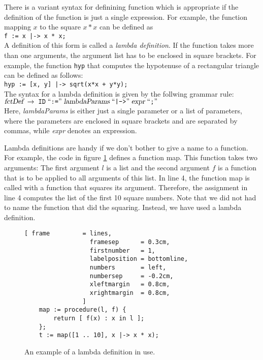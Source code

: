 There is a variant syntax for definining function which is appropriate if the definition of the
function is just a single expression.  For example, the function mapping $x$ to the square
$x*x$ can be defined as
\\[0.2cm]
\hspace*{1.3cm}
\texttt{f := x |-> x * x;}
\\[0.2cm]
A definition of this form is called a \emph{lambda definition}.
If the function takes more than one arguments, the argument list has to be enclosed in square
brackets.  For example, the function \texttt{hyp} that computes the hypotenuse of a rectangular triangle
can be defined as follows:
\\[0.2cm]
\hspace*{1.3cm}
\texttt{hyp := [x, y] |-> sqrt(x*x + y*y);}
\\[0.2cm]
The syntax for a lambda definition is given by the follwing grammar rule:
\\[0.2cm]
\hspace*{1.3cm}
$\textsl{fctDef} \;\rightarrow\; \mathtt{ID} \;\mbox{``\texttt{:=}''}\; \textsl{lambdaParams} \;\mbox{``\texttt{|->}''}\; \textsl{expr} \;\mbox{``\texttt{;}''}\;$
\\[0.2cm]
Here, \textsl{lambdaParams} is either just a single parameter or a list of parameters, where the
parameters are enclosed in square brackets and are separated by commas, while
\textsl{expr} denotes an expression.

Lambda definitions are handy if we don't bother to give a name to a function.
For example, the code in figure \ref{fig:lambda.stlx} defines a function map.  This function takes
two arguments: The first argument $l$ is a list and the second argument $f$ is a function that is to
be applied to all arguments of this list.  In line 4, the function map is called with a function
that squares its argument.  Therefore, the assignment in line 4 computes the list of the first 10
square numbers.  Note that we did not had to name the function that did the squaring.  Instead, we
have  used a lambda definition.

\begin{figure}[!ht]
\centering
\begin{Verbatim}[ frame         = lines, 
                  framesep      = 0.3cm, 
                  firstnumber   = 1,
                  labelposition = bottomline,
                  numbers       = left,
                  numbersep     = -0.2cm,
                  xleftmargin   = 0.8cm,
                  xrightmargin  = 0.8cm,
                ]
    map := procedure(l, f) {
        return [ f(x) : x in l ];
    };    
    t := map([1 .. 10], x |-> x * x);
\end{Verbatim}
\vspace*{-0.3cm}
\caption{An example of a lambda definition in use.}
\label{fig:lambda.stlx}
\end{figure}

